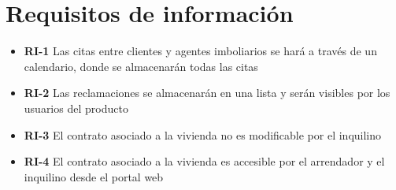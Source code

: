 \section{Requisitos de información}
\begin{itemize}
\item \textbf{RI-1} Las citas entre clientes y agentes imboliarios se hará a través de un calendario, donde se almacenarán todas las citas
\item \textbf{RI-2} Las reclamaciones se almacenarán en una lista y serán visibles por los usuarios del producto
\item \textbf{RI-3} El contrato asociado a la vivienda no es modificable por el inquilino
\item \textbf{RI-4} El contrato asociado a la vivienda es accesible por el arrendador y el inquilino desde el portal web
\end{itemize}
